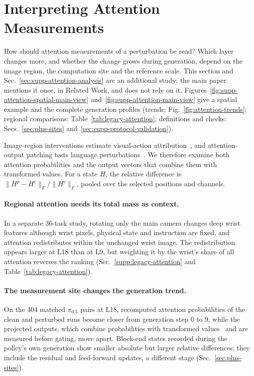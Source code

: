 \clearpage
\onecolumn
\section{Interpreting Attention Measurements}
\label{sec:supp-attention-views}
How should attention measurements of a perturbation be read? Which layer changes more, and whether the change grows during generation, depend on the image region, the computation site and the reference scale. This section and Sec.~\ref{sec:supp-attention-analysis} are an additional study; the main paper mentions it once, in Related Work, and does not rely on it. Figures~\ref{fig:supp-attention-spatial-main-view} and~\ref{fig:supp-attention-main-view} give a spatial example and the complete generation profiles (trends: Fig.~\ref{fig:attention-trends}; regional comparisons: Table~\ref{tab:legacy-attention}; definitions and checks: Secs.~\ref{sec:plus-sites} and~\ref{sec:supp-protocol-validation}).

Image-region interventions estimate visual-action attribution~\cite{zhang2026embodied}, and attention-output patching tests language perturbations~\cite{wulff2026language}. We therefore examine both attention probabilities and the output vectors that combine them with transformed values. For a state $H$, the relative difference is $\|H^p-H^c\|_F/\|H^c\|_F$, pooled over the selected positions and channels.

\paragraph{Regional attention needs its total mass as context.}
In a separate 36-task study, rotating only the main camera changes deep wrist features although wrist pixels, physical state and instruction are fixed, and attention redistributes within the unchanged wrist image. The redistribution appears larger at L18 than at L9, but weighting it by the wrist's share of all attention reverses the ranking (Sec.~\ref{supp:legacy-attention} and Table~\ref{tab:legacy-attention}).

\paragraph{The measurement site changes the generation trend.}
On the 404 matched $\pi_{0.5}$ pairs at L18, recomputed attention probabilities of the clean and perturbed runs become closer from generation step 0 to 9, while the projected outputs, which combine probabilities with transformed values~\cite{kobayashi2020} and are measured before gating, move apart. Block-end states recorded during the policy's own generation show smaller absolute but larger relative differences; they include the residual and feed-forward updates, a different stage (Sec.~\ref{sec:plus-sites}).

